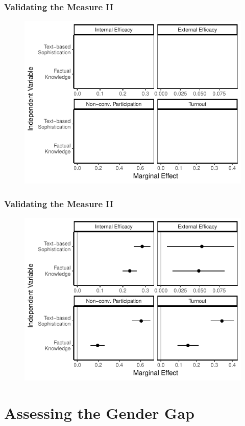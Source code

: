 \documentclass{beamer}
\begin{document}
\begin{frame} %
\frametitle{Validating the Measure II}
  \begin{figure}
  \includegraphics{../fig/knoweff_empty.pdf}
  \end{figure}
\end{frame}
\begin{frame} %
\frametitle{Validating the Measure II}
  \begin{figure}
  \includegraphics{../fig/knoweff_pres.pdf}
  \end{figure}
\end{frame}


\section{Assessing the Gender Gap}
\end{document}
